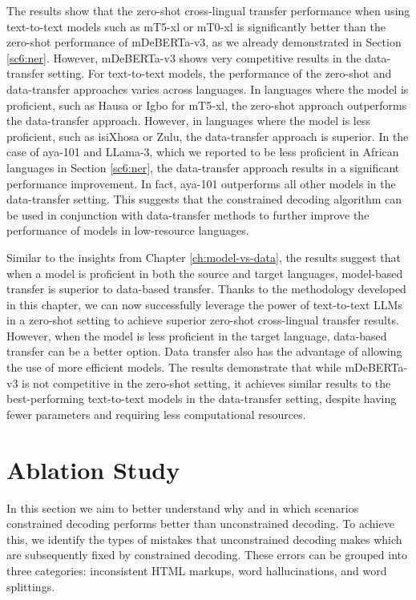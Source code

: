 

The results show that the zero-shot cross-lingual transfer performance when using text-to-text models such as mT5-xl or mT0-xl is significantly better than the zero-shot performance of mDeBERTa-v3, as we already demonstrated in Section \ref{sc6:ner}. However, mDeBERTa-v3 shows very competitive results in the data-transfer setting. For text-to-text models, the performance of the zero-shot and data-transfer approaches varies across languages. In languages where the model is proficient, such as Hausa or Igbo for mT5-xl, the zero-shot approach outperforms the data-transfer approach. However, in languages where the model is less proficient, such as isiXhosa or Zulu, the data-transfer approach is superior. In the case of aya-101 and LLama-3, which we reported to be less proficient in African languages in Section \ref{sc6:ner}, the data-transfer approach results in a significant performance improvement. In fact, aya-101 outperforms all other models in the data-transfer setting. This suggests that the constrained decoding algorithm can be used in conjunction with data-transfer methods to further improve the performance of models in low-resource languages. 

Similar to the insights from Chapter \ref{ch:model-vs-data}, the results suggest that when a model is proficient in both the source and target languages, model-based transfer is superior to data-based transfer. Thanks to the methodology developed in this chapter, we can now successfully leverage the power of text-to-text LLMs in a zero-shot setting to achieve superior zero-shot cross-lingual transfer results. However, when the model is less proficient in the target language, data-based transfer can be a better option. Data transfer also has the advantage of allowing the use of more efficient models. The results demonstrate that while mDeBERTa-v3 is not competitive in the zero-shot setting, it achieves similar results to the best-performing text-to-text models in the data-transfer setting, despite having fewer parameters and requiring less computational resources.

\section{Ablation Study}
\label{sc6:ablation}

In this section we aim to better understand why and in which scenarios constrained decoding performs better than unconstrained decoding. To achieve this, we identify the types of mistakes that unconstrained decoding makes which are subsequently fixed by constrained decoding. These errors can be grouped into three categories: inconsistent HTML markups, word hallucinations, and word splittings.

